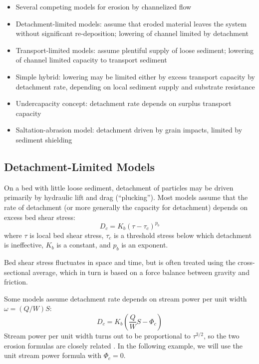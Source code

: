 \documentclass[12pt]{amsart}
\begin{document}
\begin{itemize}
\item Several competing models for erosion by channelized flow
\item Detachment-limited models: assume that eroded material leaves the system without significant re-deposition; lowering of channel limited by detachment
\item Transport-limited models: assume plentiful supply of loose sediment; lowering of channel limited capacity to transport sediment
\item Simple hybrid: lowering may be limited either by excess transport capacity by detachment rate, depending on local sediment supply and substrate resistance
\item Undercapacity concept: detachment rate depends on surplus transport capacity
\item Saltation-abrasion model: detachment driven by grain impacts, limited by sediment shielding
\end{itemize}

\subsection{Detachment-Limited Models}

On a bed with little loose sediment, detachment of particles may be driven primarily by hydraulic lift and drag (``plucking''). Most models assume that the rate of detachment (or more generally the capacity for detachment) depends on excess bed shear stress:
\begin{equation}
D_c = K_b \left( \tau - \tau_c \right)^{p_b}
\end{equation}
where $\tau$ is local bed shear stress, $\tau_c$ is a threshold stress below which detachment is ineffective, $K_b$ is a constant, and $p_b$ is an exponent.

Bed shear stress fluctuates in space and time, but is often treated using the cross-sectional average, which in turn is based on a force balance between gravity and friction.

Some models assume detachment rate depends on stream power per unit width $\omega = (Q/W) S$:
\begin{equation}
D_c = K_b \left( \frac{Q}{W}S - \Phi_c \right)
\end{equation}
Stream power per unit width turns out to be proportional to $\tau^{3/2}$, so the two erosion formulas are closely related \citep{whipple1999dynamics}. In the following example, we will use the unit stream power formula with $\Phi_c=0$.
\end{document}
